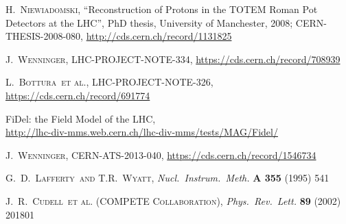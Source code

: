 \documentclass[3p,onecolumn,12pt,times,longtitle]{elsarticle}
\def\etal{et al.}
\def\Name#1{\textsc{#1}, }
\def\REVIEW#1#2#3#4{{\it #1} {\bf #2} (#3) #4}
\begin{document}
\begin{thebibliography}{99}
	\Name{H.~Niewiadomski}
	``Reconstruction of Protons in the TOTEM Roman Pot Detectors at the LHC'',
    PhD thesis, University of Manchester, 2008;
    CERN-THESIS-2008-080,
	\url{http://cds.cern.ch/record/1131825}

	\Name{J.~Wenninger}
	LHC-PROJECT-NOTE-334,
	\url{https://cds.cern.ch/record/708939}

	\Name{L.~Bottura~\etal{}}
	LHC-PROJECT-NOTE-326,
	\url{https://cds.cern.ch/record/691774}

	FiDel: the Field Model of the LHC,\\
	\url{http://lhc-div-mms.web.cern.ch/lhc-div-mms/tests/MAG/Fidel/}

	\Name{J.~Wenninger}
	CERN-ATS-2013-040,
	\url{https://cds.cern.ch/record/1546734}

	\Name{G.~D.~Lafferty~and T.R.~Wyatt}
	\REVIEW{Nucl.\ Instrum.\ Meth.}{A 355}{1995}{541}

	\Name{J.~R.~Cudell~\etal{} (COMPETE Collaboration)}
	\REVIEW{Phys.\ Rev.\ Lett.}{89}{2002}{201801}

\end{thebibliography}
\end{document}
